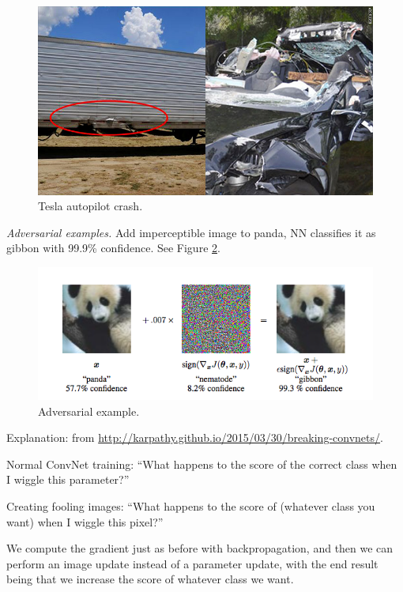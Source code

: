 \documentclass[english]{article}
\begin{document}
\begin{figure}
  \centering
  \includegraphics[scale=0.4]{tes}
  \caption{Tesla autopilot crash.}
  \label{tes}
\end{figure}
\item

\emph{Adversarial examples.} Add imperceptible image to panda, NN classifies it as gibbon with 99.9\% confidence. See Figure \ref{adv}.

\begin{figure}
  \centering
  \includegraphics[scale=0.5]{goodfellow.png}
  \caption{Adversarial example.}
  \label{adv}
\end{figure}

Explanation: from \url{http://karpathy.github.io/2015/03/30/breaking-convnets/}.

Normal ConvNet training: “What happens to the score of the correct class when I wiggle this parameter?”

Creating fooling images: “What happens to the score of (whatever class you want) when I wiggle this pixel?”

We compute the gradient just as before with backpropagation, and then we can perform an image update instead of a parameter update, with the end result being that we increase the score of whatever class we want. 
\end{document}
